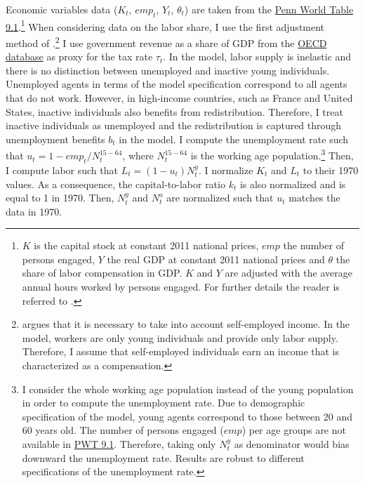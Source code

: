 Economic variables data ($K_t$, $emp_t$, $Y_t$, $\theta_t$) are taken from the \href{https://www.rug.nl/ggdc/productivity/pwt/}{Penn World Table 9.1}.\footnote{$K$ is the capital stock at constant 2011 national prices, $emp$ the number of persons engaged, $Y$ the real GDP at constant 2011 national prices and $\theta$ the share of labor compensation in GDP. $K$ and $Y$ are adjusted with the average annual hours worked by persons engaged. For further details the reader is referred to \cite{Feenstra2015}.} 
When considering data on the labor share, I use the first adjustment method of \cite{Feenstra2015}.\footnote{\cite{Gollin2002} argues that it is necessary to take into account self-employed income. In the model, workers are only young individuals and provide only labor supply. Therefore, I assume that self-employed individuals earn an income that is characterized as a compensation.}
I use government revenue as a share of GDP from the \href{https://data.oecd.org/tax/tax-revenue.htm}{OECD database} as proxy for the tax rate $\tau_t$.
In the model, labor supply is inelastic and there is no distinction between unemployed and inactive young individuals. Unemployed agents in terms of the model specification correspond to all agents that do not work. However, in high-income countries, such as France and United States, inactive individuals also benefits from redistribution. Therefore, I treat inactive individuals as unemployed and the redistribution is captured through unemployment benefits $b_t$ in the model.
I compute the unemployment rate such that $u_t = 1 - emp_t/N^{15-64}_t$, where $N_t^{15-64}$ is the working age population.\footnote{I consider the whole working age population instead of the young population in order to compute the unemployment rate. Due to demographic specification of the model, young agents correspond to those between 20 and 60 years old. The number of persons engaged ($emp$) per age groups are not available in \href{https://www.rug.nl/ggdc/productivity/pwt/}{PWT 9.1}. Therefore, taking only $N^y_t$ as denominator would bias downward the unemployment rate. Results are robust to different specifications of the unemployment rate.}
Then, I compute labor such that $L_t=(1-u_t)N_t^y$. I normalize $K_t$ and $L_t$ to their 1970 values. As a consequence, the capital-to-labor ratio $k_t$ is also normalized and is equal to 1 in 1970. Then, $N_t^y$ and $N_t^o$ are normalized such that $u_t$ matches the data in 1970.

